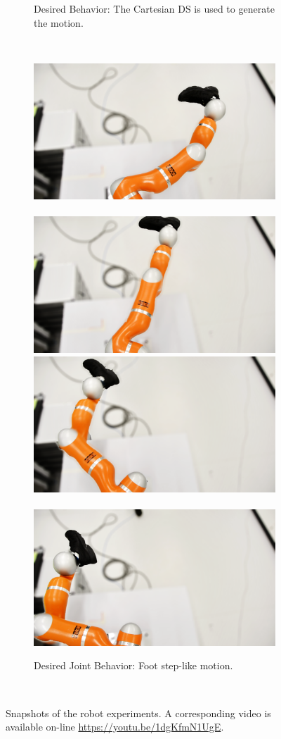 \documentclass[letterpaper, 10 pt, conference,fleqn]{ieeeconf}
\begin{document}
\begin{figure}[t]
\begin{subfigure}[t]{\linewidth}
		\caption{Desired Behavior: The Cartesian DS is used to generate the motion.}
		\label{fig:snapshot:b}
	\end{subfigure}\\
	\begin{subfigure}[t]{\linewidth}
	\centering	
		\includegraphics[width=0.45\linewidth]{Pic/1.png}~~
		\includegraphics[width=0.45\linewidth]{Pic/3.png}\\\vspace{0.1cm}
		\includegraphics[width=0.45\linewidth]{Pic/4.png}~~
		\includegraphics[width=0.45\linewidth]{Pic/2.png}
		\caption{Desired Joint Behavior: Foot step-like motion.}
		\label{fig:snapshot:c}
	\end{subfigure}\\	
	\caption{Snapshots of the robot experiments. A corresponding video is available on-line \href{https://youtu.be/1dgKfmN1UgE}{https://youtu.be/1dgKfmN1UgE}.}
	\label{fig:snapshot}
	\vspace{-0.8cm}
\end{figure}
\end{document}
